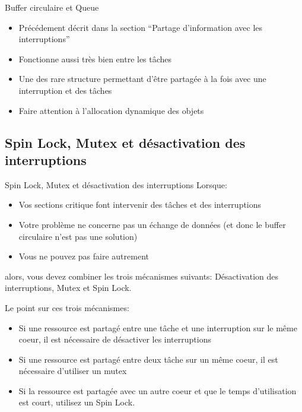 \begin{frame}[fragile]{Buffer circulaire et Queue}
  \begin{itemize} 
  \item  Précédement décrit dans  la section  ``Partage d'information
    avec les interruptions''
  \item Fonctionne aussi très bien entre les tâches
  \item Une  des rare structure  permettant d'être partagée à  la fois
    avec une interruption et des tâches
  \item Faire attention à l'allocation dynamique des objets
  \end{itemize}
\end{frame} 

\subsection{Spin Lock, Mutex et désactivation des interruptions}

\begin{frame}[fragile]{Spin Lock, Mutex et désactivation des interruptions}
  Lorsque:
  \begin{itemize} 
  \item  Vos  sections critique  font  intervenir  des  tâches et  des
    interruptions
  \item Votre problème ne concerne  pas un échange de données (et donc
    le buffer circulaire n'est pas une solution)
  \item Vous ne pouvez pas faire autrement
  \end{itemize} 
  alors,   vous  devez   combiner  les   trois   mécanismes  suivants:
  Désactivation des interruptions, Mutex et Spin Lock.

  Le point sur ces trois mécanismes:
  \begin{itemize} 
  \item  Si  une  ressource  est   partagé  entre  une  tâche  et  une
    interruption sur  le même coeur,  il est nécessaire  de désactiver
    les interruptions
  \item  Si une ressource  est partagé  entre deux  tâche sur  un même
    coeur, il est nécessaire d'utiliser un mutex
  \item Si  la ressource est  partagée avec un  autre coeur et  que le
    temps d'utilisation est court, utilisez un Spin Lock.
  \end{itemize}
\end{frame}

